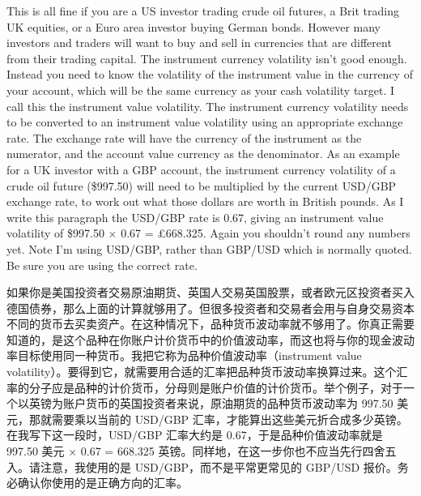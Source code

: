 
\begin{englishblock} This is all fine if you are a US investor trading crude oil futures, a Brit trading UK equities, or a Euro area investor buying German bonds. However many investors and traders will want to buy and sell in currencies that are different from their trading capital. The instrument currency volatility isn't good enough. Instead you need to know the volatility of the instrument value in the currency of your account, which will be the same currency as your cash volatility target. I call this the instrument value volatility. The instrument currency volatility needs to be converted to an instrument value volatility using an appropriate exchange rate. The exchange rate will have the currency of the instrument as the numerator, and the account value currency as the denominator. As an example for a UK investor with a GBP account, the instrument currency volatility of a crude oil future (\$997.50) will need to be multiplied by the current USD/GBP exchange rate, to work out what those dollars are worth in British pounds. As I write this paragraph the USD/GBP rate is 0.67, giving an instrument value volatility of \$997.50 × 0.67 = £668.325. Again you shouldn't round any numbers yet. Note I'm using USD/GBP, rather than GBP/USD which is normally quoted. Be sure you are using the correct rate. \end{englishblock}

\begin{chineseblock}如果你是美国投资者交易原油期货、英国人交易英国股票，或者欧元区投资者买入德国债券，那么上面的计算就够用了。但很多投资者和交易者会用与自身交易资本不同的货币去买卖资产。在这种情况下，品种货币波动率就不够用了。你真正需要知道的，是这个品种在你账户计价货币中的价值波动率，而这也将与你的现金波动率目标使用同一种货币。我把它称为品种价值波动率（instrument value volatility）。要得到它，就需要用合适的汇率把品种货币波动率换算过来。这个汇率的分子应是品种的计价货币，分母则是账户价值的计价货币。举个例子，对于一个以英镑为账户货币的英国投资者来说，原油期货的品种货币波动率为 997.50 美元，那就需要乘以当前的 USD/GBP 汇率，才能算出这些美元折合成多少英镑。在我写下这一段时，USD/GBP 汇率大约是 0.67，于是品种价值波动率就是 997.50 美元 × 0.67 = 668.325 英镑。同样地，在这一步你也不应当先行四舍五入。请注意，我使用的是 USD/GBP，而不是平常更常见的 GBP/USD 报价。务必确认你使用的是正确方向的汇率。\end{chineseblock}

